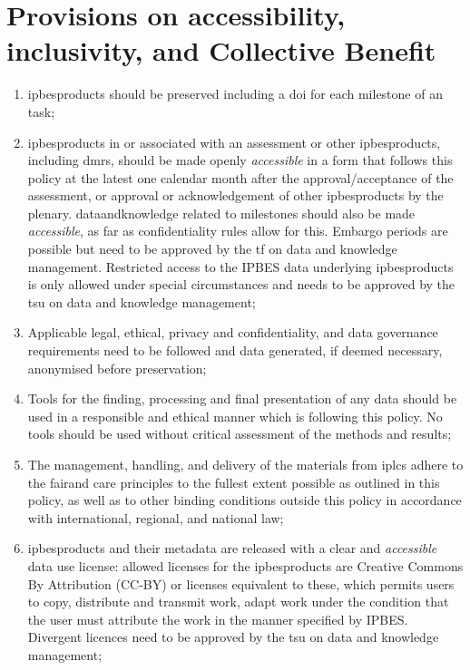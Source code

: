\documentclass{article}
\begin{document}
\section{Provisions on accessibility, inclusivity, and Collective Benefit}

\begin{enumerate}[label=(\alph*)]
    \item \glspl{ipbesproduct} should be preserved including a \gls{doi} for each \gls{milestone} of an \gls{task};

    \item \glspl{ipbesproduct} in or associated with an assessment or other \glspl{ipbesproduct}, including \glspl{dmr}, should be made openly \textit{accessible} in a form that follows this policy at the latest one calendar month after the approval/acceptance of the assessment, or approval or acknowledgement of other \glspl{ipbesproduct} by the \gls{plenary}. \gls{dataandknowledge} related to \glspl{milestone} should also be made \textit{accessible}, as far as confidentiality rules allow for this. Embargo periods are possible but need to be approved by the \gls{tf} on data and knowledge management. Restricted access to the IPBES \gls{data} underlying \glspl{ipbesproduct} is only allowed under special circumstances and needs to be approved by the  \gls{tsu} on \gls{data} and \gls{knowledge} management;

    \item Applicable legal, ethical, privacy and confidentiality, and \gls{data} governance requirements need to be followed and \gls{data} generated, if deemed necessary, anonymised before preservation;

    \item Tools for the finding, processing and final presentation of any \gls{data} should be used in a responsible and ethical manner which is following this policy. No tools should be used without critical assessment of the methods and results;

    \item The management, handling, and delivery of the materials from \glspl{iplc} adhere to the \gls{fair}and \gls{care} principles to the fullest extent possible as outlined in this policy, as well as to other binding conditions outside this policy in accordance with international, regional, and national law;

    \item \glspl{ipbesproduct} and their metadata are released with a clear and \textit{accessible} \gls{data} use license: allowed licenses for the \glspl{ipbesproduct} are Creative Commons By Attribution (CC-BY) or licenses equivalent to these, which permits users to copy, distribute and transmit work, adapt work under the condition that the user must attribute the work in the manner specified by IPBES. Divergent licences need to be approved by the  \gls{tsu} on \gls{data} and \gls{knowledge} management;


\end{enumerate}
\end{document}
